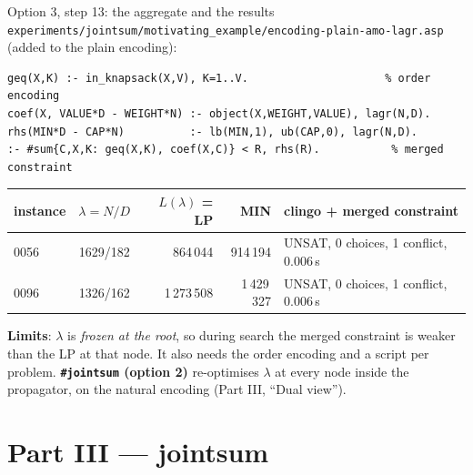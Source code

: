 \documentclass[aspectratio=169,11pt]{beamer}
\newcommand{\file}[1]{{\small\texttt{\color{acc}#1}}}
\begin{document}
\begin{frame}[fragile]{Option 3, step 13: the aggregate and the results}
\footnotesize
\file{experiments/jointsum/motivating\_example/encoding-plain-amo-lagr.asp} (added to the plain encoding):
\begin{lstlisting}
geq(X,K) :- in_knapsack(X,V), K=1..V.                     % order encoding
coef(X, VALUE*D - WEIGHT*N) :- object(X,WEIGHT,VALUE), lagr(N,D).
rhs(MIN*D - CAP*N)          :- lb(MIN,1), ub(CAP,0), lagr(N,D).
:- #sum{C,X,K: geq(X,K), coef(X,C)} < R, rhs(R).           % merged constraint
\end{lstlisting}
\begin{center}
\begin{tabular}{lcrrl}\toprule
instance & $\lambda = N/D$ & $L(\lambda)$ = LP & MIN & clingo + merged constraint \\\midrule
0056 & 1629/182 & 864\,044 & 914\,194 & UNSAT, 0 choices, 1 conflict, 0.006\,s\\
0096 & 1326/162 & 1\,273\,508 & 1\,429\,327 & UNSAT, 0 choices, 1 conflict, 0.006\,s\\\bottomrule
\end{tabular}
\end{center}
\textbf{Limits}: $\lambda$ is \emph{frozen at the root}, so during search the merged constraint is weaker than the LP at that node.
It also needs the order encoding and a script per problem. \textbf{\texttt{\#jointsum} (option 2)} re-optimises $\lambda$ at every node
inside the propagator, on the natural encoding (Part III, ``Dual view'').
\end{frame}


\section{Part III --- jointsum}
\end{document}
